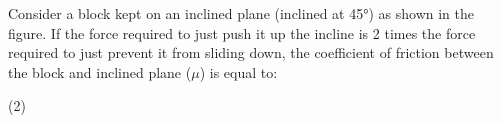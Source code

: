 \item Consider a block kept on an inclined plane (inclined at 45°) as shown in the figure. If the force required to just push it up the incline is 2 times the force required to just prevent it from sliding down, the coefficient of friction between the block and inclined plane (\(\mu\)) is equal to:
\begin{center}
\end{center}
\begin{tasks}(2)
\end{tasks}